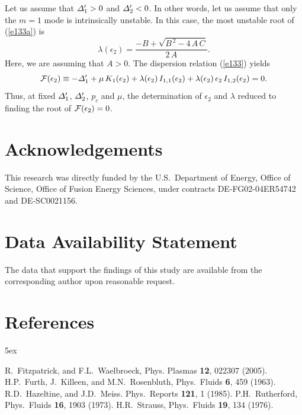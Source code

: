 \documentclass[12pt,prb,aps]{revtex4-1}
\begin{document}
Let us assume that ${\mit\Delta}_1'>0$ and ${\mit\Delta}_2'< 0$. In other words, let us assume that only the
$m=1$ mode is intrinsically unstable. In this case, the most unstable root of (\ref{e133a}) is
\begin{equation}
\lambda(\epsilon_2) = \frac{-B +\sqrt{B^{\,2}-4\,A\,C}}{2\,A}.
\end{equation}
Here, we are assuming that $A>0$. The dispersion relation (\ref{e133})  yields
\begin{equation}
{\cal F}(\epsilon_2)\equiv -{\mit\Delta}_1'+\mu\,K_1(\epsilon_2)+\lambda(\epsilon_2)\,I_{1,1}(\epsilon_2)+\lambda(\epsilon_2)\,\epsilon_2\,I_{1,2}(\epsilon_2) = 0.
\end{equation}
Thus, at fixed ${\mit\Delta}_1'$, ${\mit\Delta}_2'$, $p_c$ and $\mu$, the determination of $\epsilon_2$ and $\lambda$ reduced to finding the root of ${\cal F}(\epsilon_2)=0$. 

\section*{Acknowledgements}
This research was directly funded by the U.S.\ Department of Energy, Office of Science, Office of Fusion Energy Sciences,  under  contracts DE-FG02-04ER54742 and DE-SC0021156. 

\section*{Data Availability Statement}
The data that support the findings of this study are available from the corresponding author upon reasonable request.

\section*{References}
\begin{thebibliography}{99}\baselineskip 5ex

 R.~Fitzpatrick, and F.L.~Waelbroeck, Phys. Plasmas {\bf 12}, 022307 (2005).
 H.P.~Furth, J.~Killeen, and M.N.~Rosenbluth, Phys.\ Fluids {\bf 6}, 459 (1963).
 R.D.~Hazeltine, and J.D.~Meiss. Phys.\ Reports {\bf 121}, 1 (1985).
 P.H.~Rutherford,  Phys.\ Fluids {\bf 16}, 1903 (1973).
 H.R.~Strauss, Phys.\  Fluids {\bf 19}, 134 (1976). 
\end{thebibliography}
\end{document}
